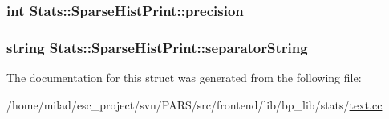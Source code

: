 \label{structStats_1_1SparseHistPrint_ab767d5886007c432b86a42171f7e1206}
\hypertarget{structStats_1_1SparseHistPrint_a3d11c791cb60284686ed2458773cc52f}{
\subsubsection[{precision}]{\setlength{\rightskip}{0pt plus 5cm}int {\bf Stats::SparseHistPrint::precision}}}
\label{structStats_1_1SparseHistPrint_a3d11c791cb60284686ed2458773cc52f}
\hypertarget{structStats_1_1SparseHistPrint_a72260b9f02d5395232d733329fc6c427}{
\subsubsection[{separatorString}]{\setlength{\rightskip}{0pt plus 5cm}string {\bf Stats::SparseHistPrint::separatorString}}}
\label{structStats_1_1SparseHistPrint_a72260b9f02d5395232d733329fc6c427}


The documentation for this struct was generated from the following file:\begin{DoxyCompactItemize}
\item 
/home/milad/esc\_\-project/svn/PARS/src/frontend/lib/bp\_\-lib/stats/\hyperlink{text_8cc}{text.cc}\end{DoxyCompactItemize}
